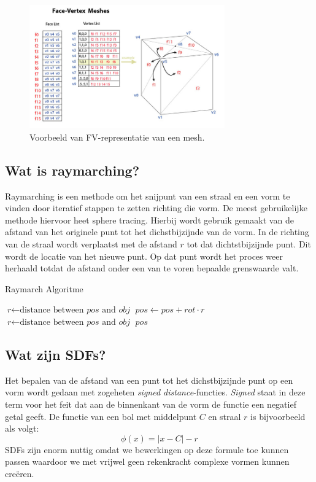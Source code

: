 \documentclass[12pt, a4paper]{article}
\begin{document}
\begin{figure}[H]
    \centering
    \includegraphics[width=0.75\textwidth]{Face-Vertex_Meshes.jpg}
    \caption{Voorbeeld van FV-representatie van een mesh.}
    \label{fig:face_vertex}
\end{figure}

\subsection{Wat is raymarching?}
Raymarching is een methode om het snijpunt van een straal en een vorm te vinden door iteratief stappen te zetten richting die vorm. De meest gebruikelijke methode hiervoor heet sphere tracing. Hierbij wordt gebruik gemaakt van de afstand van het originele punt tot het dichstbijzijnde van de vorm. In de richting van de straal wordt verplaatst met de afstand \(r\) tot dat dichtstbijzijnde punt. Dit wordt de locatie van het nieuwe punt. Op dat punt wordt het proces weer herhaald totdat de afstand onder een van te voren bepaalde grenswaarde valt.
\begin{algorithm}
\caption{Raymarch Algoritme}\label{euclid}
\begin{algorithmic}[1]
\State $\textit{r} \gets \text{distance between }\textit{pos}\text{ and }\textit{obj}$
\State $\textit{pos} \gets \textit{pos} + \textit{rot} \cdot r$
\State $\textit{r} \gets \text{distance between }\textit{pos}\text{ and }\textit{obj}$
\EndWhile
\Return $\textit{pos}$
\EndProcedure
\end{algorithmic}
\end{algorithm}

\subsection{Wat zijn SDFs?}
Het bepalen van de afstand van een punt tot het dichstbijzijnde punt op een vorm wordt gedaan met zogeheten \emph{signed distance}-functies. \emph{Signed} staat in deze term voor het feit dat aan de binnenkant van de vorm de functie een negatief getal geeft. De functie van een bol met middelpunt \(C\) en straal \(r\) is bijvoorbeeld als volgt:
\[\phi (x)=\left |x-C \right | -r\]
SDFs zijn enorm nuttig omdat we bewerkingen op deze formule toe kunnen passen waardoor we met vrijwel geen rekenkracht complexe vormen kunnen creëren. 
\end{document}
